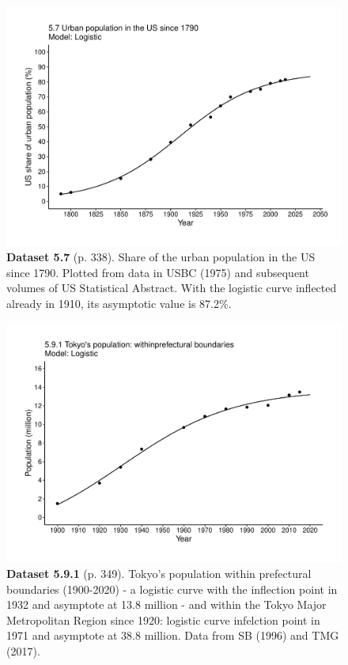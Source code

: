 \documentclass[aps,rmp,preprint,superscriptaddress,10pt,onecolumn]{article}
\begin{document}
\clearpage
\begin{figure}[h]
\includegraphics[width=\textwidth]{output/figs-ggplot/5.7.pdf}
\caption*{\textbf{Dataset 5.7} (p. 338). Share of the urban population in the US since 1790. Plotted from data in USBC (1975) and subsequent volumes of US Statistical Abstract. With the logistic curve inflected already in 1910, its asymptotic value is 87.2\%.}
\end{figure}
	
\clearpage
\begin{figure}[h]
\includegraphics[width=\textwidth]{output/figs-ggplot/5.9.1.pdf}
\caption*{\textbf{Dataset 5.9.1} (p. 349). Tokyo's population within prefectural boundaries (1900-2020) - a logistic curve with the inflection point in 1932 and asymptote at 13.8 million - and within the Tokyo Major Metropolitan Region since 1920: logistic curve infelction point in 1971 and asymptote at 38.8 million. Data from SB (1996) and TMG (2017). }
\end{figure}
	
\end{document}
